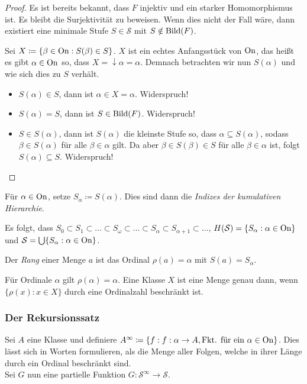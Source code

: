 \begin{proof}
	Es ist bereits bekannt, dass $F$ injektiv und ein starker Homomorphismus ist. Es bleibt die Surjektivität zu beweisen. Wenn dies nicht der Fall wäre, dann existiert eine minimale Stufe $S\in\mathcal{S}$ mit $S\notin \operatorname{Bild}(F)$. 
	
	Sei $X\coloneqq\{\beta\in \operatorname{On}:S(\beta)\in S\}$. $X$ ist ein echtes Anfangsstück von $\operatorname{On}$, das heißt es gibt $\alpha\in \operatorname{On}$ so, dass $X=\downarrow \alpha=\alpha$. Demnach betrachten wir nun $S(\alpha)$ und wie sich dies zu $S$ verhält.
	\begin{itemize}
		\item $S(\alpha)\in S$, dann ist $\alpha\in X=\alpha$. Widerspruch!
		\item $S(\alpha)=S$, dann ist $S\in \operatorname{Bild}(F)$. Widerspruch!
		\item $S\in S(\alpha)$, dann ist $S(\alpha)$ die kleinste Stufe so, dass $\alpha\subseteq S(\alpha)$, sodass $\beta\in S(\alpha)$ für alle $\beta\in\alpha$ gilt. 
		Da aber $\beta\in S(\beta)\in S$ für alle $\beta\in\alpha$ ist, folgt $S(\alpha)\subseteq S$. Widerspruch!
	\end{itemize}
\end{proof}

\begin{definition}
	Für $\alpha\in \operatorname{On}$, setze $S_\alpha\coloneqq S(\alpha)$. Dies sind dann die \textit{Indizes der kumulativen Hierarchie}.
\end{definition}

Es folgt, dass $S_0\subset S_1 \subset \dots \subset S_\omega \subset \dots \subset S_\alpha \subset S_{\alpha+1}\subset\dots$, $H(\mathcal{S})=\{S_\alpha:\alpha\in \operatorname{On}\}$ und $\mathcal{S}=\bigcup\{S_\alpha : \alpha\in \operatorname{On}\}$.

\begin{definition}
	Der \textit{Rang} einer Menge $a$ ist das Ordinal $\rho(a)=\alpha$ mit $S(a)=S_\alpha$.
\end{definition}

Für Ordinale $\alpha$ gilt $\rho(\alpha)=\alpha$. Eine Klasse $X$ ist eine Menge genau dann, wenn $\{\rho(x):x\in X\}$ durch eine Ordinalzahl beschränkt ist.

\subsubsection{Der Rekursionssatz}

Sei $A$ eine Klasse und definiere $A^\infty\coloneqq\{f : f:\alpha\to A, \text{Fkt. für ein } \alpha\in \operatorname{On}\}$. Dies lässt sich in Worten formulieren, als die Menge aller Folgen, welche in ihrer Länge durch ein Ordinal beschränkt sind.
\\
Sei $G$ nun eine partielle Funktion $G:\mathcal{S}^\infty\to\mathcal{S}$.

